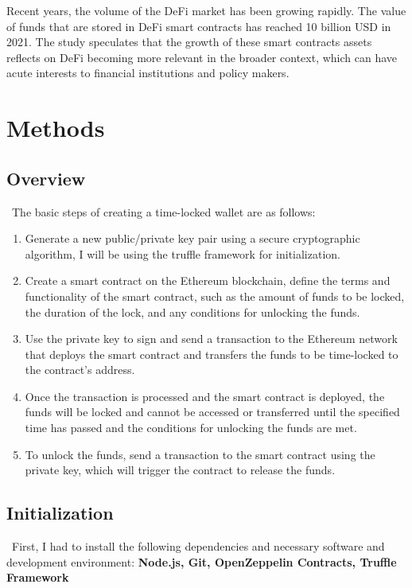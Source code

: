 \documentclass[10pt,twocolumn]{article}
\begin{document}
Recent years, the volume of the DeFi market has been growing rapidly. The value of funds that are stored in DeFi smart contracts has reached 10 billion USD in 2021. The study speculates that the growth of these smart contracts assets reflects on DeFi becoming more relevant in the broader context, which can have acute interests to financial institutions and policy makers.\cite{Bartos}



\section{Methods}
\subsection{Overview}\
The basic steps of creating a time-locked wallet are as follows:
\begin{enumerate}
  \item Generate a new public/private key pair using a secure cryptographic algorithm, I will be using the truffle framework for initialization.
  \item Create a smart contract on the Ethereum blockchain, define the terms and functionality of the smart contract, such as the amount of funds to be locked, the duration of the lock, and any conditions for unlocking the funds.
  \item Use the private key to sign and send a transaction to the Ethereum network that deploys the smart contract and transfers the funds to be time-locked to the contract's address.
  \item Once the transaction is processed and the smart contract is deployed, the funds will be locked and cannot be accessed or transferred until the specified time has passed and the conditions for unlocking the funds are met.
  \item To unlock the funds, send a transaction to the smart contract using the private key, which will trigger the contract to release the funds.
\end{enumerate}

\subsection{Initialization}\
First, I had to install the following dependencies and necessary software and development environment: \textbf{Node.js, Git, OpenZeppelin Contracts, Truffle Framework}
\end{document}
